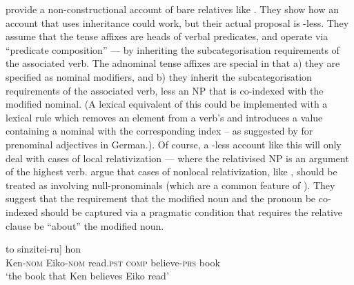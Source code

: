 \documentclass[output=paper
 	        ,biblatex
                ,babelshorthands
                ,newtxmath
                ,draftmode
                ,colorlinks, citecolor=brown
]{langscibook}
\begin{document}
\citet{SiraiGunjiRelative} provide a non-constructional account of  bare relatives
like . They show how an account that uses  inheritance could
work, but their actual proposal is -less. They assume that the tense affixes
are heads of verbal predicates, and operate via ``predicate composition'' --- by
inheriting the subcategorisation requirements of the associated verb. The adnominal tense
affixes are special in that a) they are specified as nominal modifiers, and b) they
inherit the subcategorisation requirements of the associated verb, less an NP that is
co-indexed with the modified nominal. (A lexical equivalent of this could be implemented with a lexical rule which removes an
element from a verb's  and introduces a  value containing a
nominal with the corresponding index -- as suggested by \citet[Section~3.2.7]{Mueller2002b} for prenominal
adjectives in German.).
Of course, a -less account like this
will only deal with cases of local relativization --- where the relativised NP is an
argument of the highest verb. \citeauthor{SiraiGunjiRelative} argue that cases of
nonlocal relativization, like , should be treated as involving
null-pronominals (which are a common feature of ). They suggest that the requirement
that the modified noun and the pronoun be co-indexed should be captured via a pragmatic
condition that requires the relative clause be ``about'' the modified noun.
 \begin{exe}\ex\label{x:rc-85}
   \gll [Ken-ga                                  [Eiko-ga     \trace\subscr{i} yon-da] to sinzitei-ru] hon\\
        \hphantom{[}Ken-\textsc{nom} \hphantom{[}Eiko-\textsc{nom} {}        read.\textsc{pst} \textsc{comp}
          believe-\textsc{prs} book\\
 \glt `the book that Ken believes Eiko read'
 \end{exe}

\end{document}
